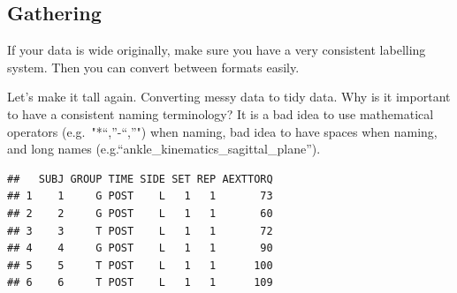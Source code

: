 \documentclass[
]{book}
\newenvironment{Shaded}{\begin{snugshade}}{\end{snugshade}}
\newcommand{\CommentTok}[1]{\textcolor[rgb]{0.56,0.35,0.01}{\textit{#1}}}
\newcommand{\DataTypeTok}[1]{\textcolor[rgb]{0.13,0.29,0.53}{#1}}
\newcommand{\DecValTok}[1]{\textcolor[rgb]{0.00,0.00,0.81}{#1}}
\newcommand{\KeywordTok}[1]{\textcolor[rgb]{0.13,0.29,0.53}{\textbf{#1}}}
\newcommand{\NormalTok}[1]{#1}
\newcommand{\OperatorTok}[1]{\textcolor[rgb]{0.81,0.36,0.00}{\textbf{#1}}}
\newcommand{\StringTok}[1]{\textcolor[rgb]{0.31,0.60,0.02}{#1}}
\begin{document}
\hypertarget{gathering}{%
\subsection*{Gathering}\label{gathering}}

If your data is wide originally, make sure you have a very consistent labelling system. Then you can convert between formats easily.

Let's make it tall again. Converting messy data to tidy data. Why is it important to have a consistent naming terminology? It is a bad idea to use mathematical operators (e.g.~"*``,''-``,''") when naming, bad idea to have spaces when naming, and long names (e.g.``ankle\_kinematics\_sagittal\_plane'').

\begin{Shaded}
\end{Shaded}

\begin{verbatim}
##   SUBJ GROUP TIME SIDE SET REP AEXTTORQ
## 1    1     G POST    L   1   1       73
## 2    2     G POST    L   1   1       60
## 3    3     T POST    L   1   1       72
## 4    4     G POST    L   1   1       90
## 5    5     T POST    L   1   1      100
## 6    6     T POST    L   1   1      109
\end{verbatim}
\end{document}
